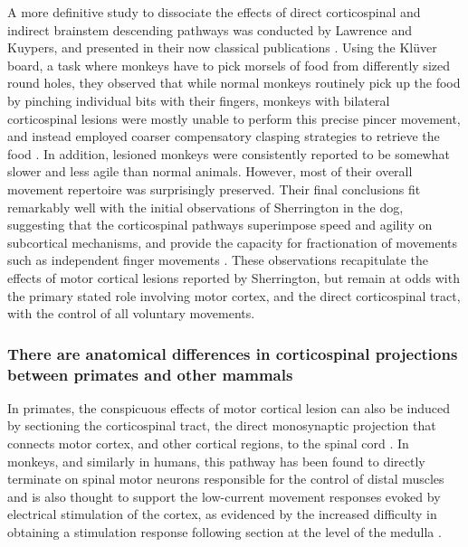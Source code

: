 A more definitive study to dissociate the effects of direct corticospinal and indirect brainstem descending pathways was conducted by Lawrence and Kuypers, and presented in their now classical publications \cite{Lawrence1968,Lawrence1968a}. Using the Kl\"uver board, a task where monkeys have to pick morsels of food from differently sized round holes, they observed that while normal monkeys routinely pick up the food by pinching individual bits with their fingers, monkeys with bilateral corticospinal lesions were mostly unable to perform this precise pincer movement, and instead employed coarser compensatory clasping strategies to retrieve the food \cite{Lawrence1968}. In addition, lesioned monkeys were consistently reported to be somewhat slower and less agile than normal animals. However, most of their overall movement repertoire was surprisingly preserved. Their final conclusions fit remarkably well with the initial observations of Sherrington in the dog, suggesting that the corticospinal pathways superimpose speed and agility on subcortical mechanisms, and provide the capacity for fractionation of movements such as independent finger movements \cite{Lawrence1968}. These observations recapitulate the effects of motor cortical lesions reported by Sherrington, but remain at odds with the primary stated role involving motor cortex, and the direct corticospinal tract, with the control of all voluntary movements.

\subsubsection*{There are anatomical differences in corticospinal projections between primates and other mammals}

In primates, the conspicuous effects of motor cortical lesion can also be induced by sectioning the corticospinal tract, the direct monosynaptic projection that connects motor cortex, and other cortical regions, to the spinal cord \cite{Tower1940,Lawrence1968}. In monkeys, and similarly in humans, this pathway has been found to directly terminate on spinal motor neurons responsible for the control of distal muscles \cite{Leyton1917,Bernhard1954} and is also thought to support the low-current movement responses evoked by electrical stimulation of the cortex, as evidenced by the increased difficulty in obtaining a stimulation response following section at the level of the medulla \cite{Woolsey1972}.

